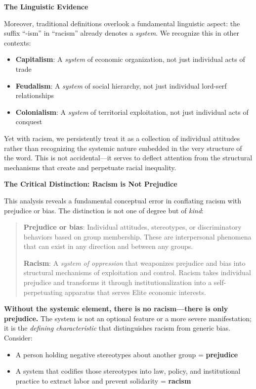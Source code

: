 \documentclass[12pt,openany]{book}
\begin{document}
\textbf{The Linguistic Evidence}

Moreover, traditional definitions overlook a fundamental linguistic aspect: the suffix ``-ism'' in ``racism'' already denotes a \textit{system}. We recognize this in other contexts:
\begin{itemize}
    \item \textbf{Capitalism}: A \textit{system} of economic organization, not just individual acts of trade
    \item \textbf{Feudalism}: A \textit{system} of social hierarchy, not just individual lord-serf relationships
    \item \textbf{Colonialism}: A \textit{system} of territorial exploitation, not just individual acts of conquest
\end{itemize}

Yet with racism, we persistently treat it as a collection of individual attitudes rather than recognizing the systemic nature embedded in the very structure of the word. This is not accidental---it serves to deflect attention from the structural mechanisms that create and perpetuate racial inequality.

\textbf{The Critical Distinction: Racism is Not Prejudice}

This analysis reveals a fundamental conceptual error in conflating racism with prejudice or bias. The distinction is not one of degree but of \textit{kind}:

\begin{quote}
\textbf{Prejudice or bias}: Individual attitudes, stereotypes, or discriminatory behaviors based on group membership. These are interpersonal phenomena that can exist in any direction and between any groups.

\textbf{Racism}: A \textit{system of oppression} that weaponizes prejudice and bias into structural mechanisms of exploitation and control. Racism takes individual prejudice and transforms it through institutionalization into a self-perpetuating apparatus that serves Elite economic interests.
\end{quote}

\textbf{Without the systemic element, there is no racism---there is only prejudice.} The system is not an optional feature or a more severe manifestation; it is the \textit{defining characteristic} that distinguishes racism from generic bias. Consider:

\begin{itemize}
    \item A person holding negative stereotypes about another group = \textbf{prejudice}
    \item A system that codifies those stereotypes into law, policy, and institutional practice to extract labor and prevent solidarity = \textbf{racism}
\end{itemize}
\end{document}
